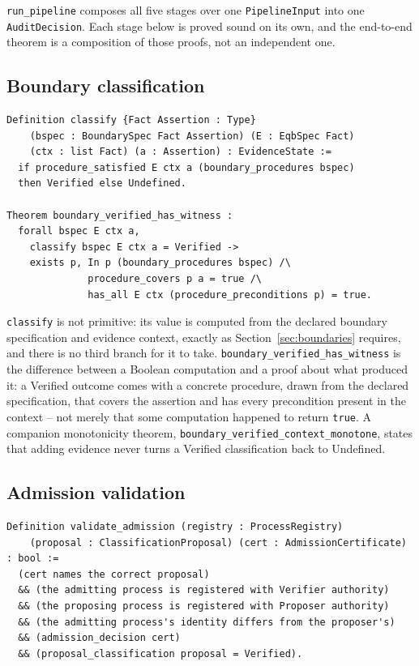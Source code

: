 \documentclass[smallcondensed,envcountsect,natbib]{svjour3}
\newcommand{\state}[1]{\textsf{#1}}
\begin{document}
\texttt{run\_pipeline} composes all five stages over one \texttt{PipelineInput} into one \texttt{AuditDecision}. Each stage below is proved sound on its own, and the end-to-end theorem is a composition of those proofs, not an independent one.

\subsection*{Boundary classification}

\begin{lstlisting}
Definition classify {Fact Assertion : Type}
    (bspec : BoundarySpec Fact Assertion) (E : EqbSpec Fact)
    (ctx : list Fact) (a : Assertion) : EvidenceState :=
  if procedure_satisfied E ctx a (boundary_procedures bspec)
  then Verified else Undefined.

Theorem boundary_verified_has_witness :
  forall bspec E ctx a,
    classify bspec E ctx a = Verified ->
    exists p, In p (boundary_procedures bspec) /\
              procedure_covers p a = true /\
              has_all E ctx (procedure_preconditions p) = true.
\end{lstlisting}

\texttt{classify} is not primitive: its value is computed from the declared boundary specification and evidence context, exactly as Section~\ref{sec:boundaries} requires, and there is no third branch for it to take. \texttt{boundary\_verified\_has\_witness} is the difference between a Boolean computation and a proof about what produced it: a \state{Verified} outcome comes with a concrete procedure, drawn from the declared specification, that covers the assertion and has every precondition present in the context -- not merely that some computation happened to return \texttt{true}. A companion monotonicity theorem, \texttt{boundary\_verified\_context\_monotone}, states that adding evidence never turns a \state{Verified} classification back to \state{Undefined}.

\subsection*{Admission validation}

\begin{lstlisting}
Definition validate_admission (registry : ProcessRegistry)
    (proposal : ClassificationProposal) (cert : AdmissionCertificate) : bool :=
  (cert names the correct proposal)
  && (the admitting process is registered with Verifier authority)
  && (the proposing process is registered with Proposer authority)
  && (the admitting process's identity differs from the proposer's)
  && (admission_decision cert)
  && (proposal_classification proposal = Verified).
\end{lstlisting}
\end{document}
